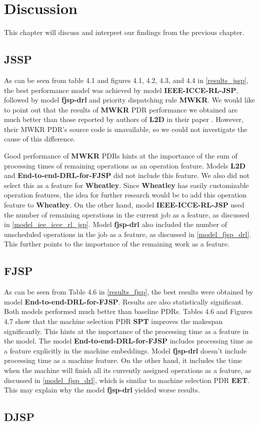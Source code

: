 \chapter{Discussion}

This chapter will discuss and interpret our findings from the previous chapter.

\section{JSSP}
As can be seen from table 4.1 and figures 4.1, 4.2, 4.3, and 4.4 in \ref{results_jssp}, the best performance model was achieved by model \textbf{IEEE-ICCE-RL-JSP}, followed by model \textbf{fjsp-drl} and priority dispatching rule \textbf{MWKR}. We would like to point out that the results of \textbf{MWKR} PDR performance we obtained are much better than those reported by authors of \textbf{L2D} in their paper \cite{zhang2020learning}. However, their MWKR PDR's source code is unavailable, so we could not investigate the cause of this difference.
\par
Good performance of \textbf{MWKR} PDRs hints at the importance of the sum of processing times of remaining operations as an operation feature. Models \textbf{L2D} and \textbf{End-to-end-DRL-for-FJSP} did not include this feature. We also did not select this as a feature for \textbf{Wheatley}. Since \textbf{Wheatley} has easily customizable operation features, the idea for further research would be to add this operation feature to \textbf{Wheatley}. On the other hand, model \textbf{IEEE-ICCE-RL-JSP} used the number of remaining operations in the current job as a feature, as discussed in \ref{model_iee_icce_rl_jsp}. Model \textbf{fjsp-drl} also included the number of unscheduled operations in the job as a feature, as discussed in \ref{model_fjsp_drl}. This further points to the importance of the remaining work as a feature. 

\section{FJSP}
As can be seen from Table 4.6 in \ref{results_fjsp}, the best results were obtained by model \textbf{End-to-end-DRL-for-FJSP}. Results are also statistically significant. Both models performed much better than baseline PDRs. Tables 4.6 and Figures 4.7 show that the machine selection PDR \textbf{SPT} improves the makespan significantly. This hints at the importance of the processing time as a feature in the model. The model \textbf{End-to-end-DRL-for-FJSP} includes processing time as a feature explicitly in the machine embeddings. Model \textbf{fjsp-drl} doesn't include processing time as a machine feature. On the other hand, it includes the time when the machine will finish all its currently assigned operations as a feature, as discussed in \ref{model_fjsp_drl}, which is similar to machine selection PDR \textbf{EET}. This may explain why the model \textbf{fjsp-drl} yielded worse results.

\section{DJSP}

